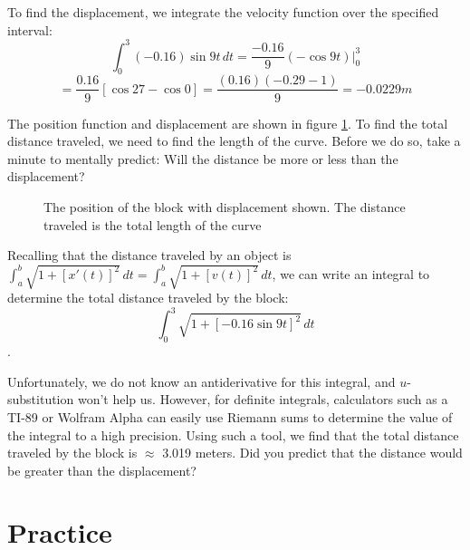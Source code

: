 To find the displacement, we integrate the velocity function over the 
specified interval:
$$\int_0^3 (-0.16)\sin{9t}\,dt = \frac{-0.16}{9}(-\cos{9t})|_0^3$$
$$=\frac{0.16}{9}[\cos{27} - \cos{0}] = \frac{(0.16)(-0.29 - 1)}{9} 
= -0.0229 m$$

The position function and displacement are shown in figure 
\ref{fig:block}. To find the total distance traveled, we need to find 
the length of the curve. Before we do so, take a minute to mentally 
predict: Will the distance be more or less than the displacement?

\begin{figure}[htbp]
\centering
    \caption{The position of the block with displacement shown. The 
    distance traveled is the total length of the curve}
    \label{fig:block}
\end{figure}

Recalling that the distance traveled by an object is 
$\int_a^b \sqrt{1+[x'(t)]^2}\,dt = \int_a^b \sqrt{1 + [v(t)]^2}\,dt$, 
we can write an integral to determine the total distance traveled by the block:
$$\int_0^3 \sqrt{1 + [-0.16\sin{9t}]^2}\,dt$$.

Unfortunately, we do not know an antiderivative for this integral, and 
$u$-substitution won't help us. However, for definite integrals, 
calculators such as a TI-89 or Wolfram Alpha can easily use Riemann 
sums to determine the value of the integral to a high precision. Using 
such a tool, we find that the total distance traveled by the block is 
$\approx$ 3.019 meters. Did you predict that the distance would be 
greater than the displacement?

\section{Practice}

